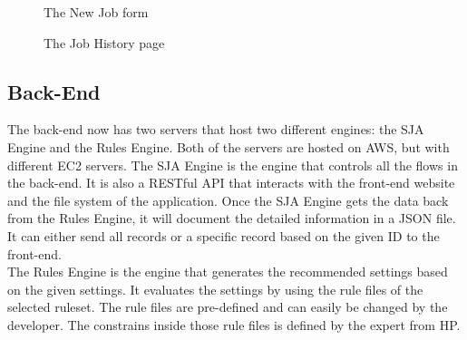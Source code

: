 \documentclass[onecolumn, draftclsnofoot,10pt, compsoc]{IEEEtran}
\begin{document}
\newpage
\begin{figure}[!ht]
    \caption{The New Job form}
    \label{fig:2}
    \vspace*{\floatsep}
    \caption{The Job History page}
    \label{fig:3}
\end{figure}

\newpage
\subsection{Back-End}
The back-end now has two servers that host two different engines: the SJA Engine and the Rules Engine. Both of the servers are hosted on AWS, but with different EC2 servers. The SJA Engine is the engine that controls all the flows in the back-end. It is also a RESTful API that interacts with the front-end website and the file system of the application. Once the SJA Engine gets the data back from the Rules Engine, it will document the detailed information in a JSON file. It can either send all records or a specific record based on the given ID to the front-end.\\[10pt]
The Rules Engine is the engine that generates the recommended settings based on the given settings. It evaluates the settings by using the rule files of the selected ruleset. The rule files are pre-defined and can easily be changed by the developer. The constrains inside those rule files is defined by the expert from HP. 
\end{document}
